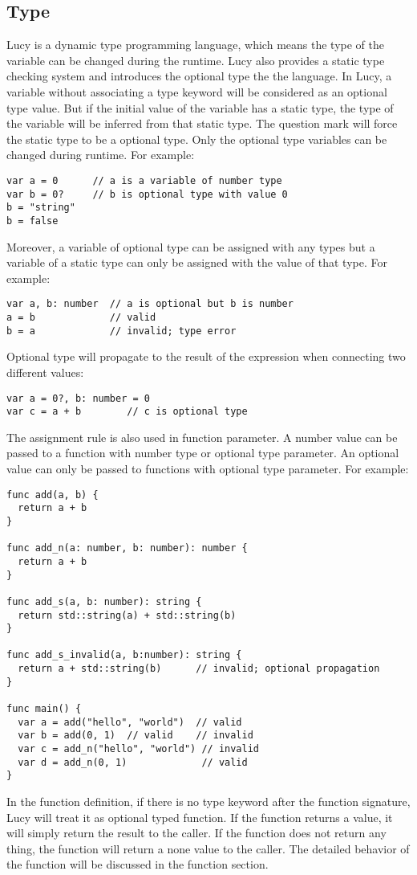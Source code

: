 \subsection{Type}
Lucy is a dynamic type programming language, which means the type of the variable can be changed during the runtime. Lucy also provides a static type checking system and introduces the optional type the the language. In Lucy, a variable without associating a type keyword will be considered as an optional type value. But if the initial value of the variable has a static type, the type of the variable will be inferred from that static type. The question mark will force the static type to be a optional type. Only the optional type variables can be changed during runtime. For example:
\begin{lstlisting}
var a = 0      // a is a variable of number type
var b = 0?     // b is optional type with value 0
b = "string"
b = false
\end{lstlisting}
Moreover, a variable of optional type can be assigned with any types but a variable of a static type can only be assigned with the value of that type. For example:
\begin{lstlisting}
var a, b: number  // a is optional but b is number
a = b             // valid
b = a             // invalid; type error
\end{lstlisting}
Optional type will propagate to the result of the expression when connecting two different values:
\begin{lstlisting}
var a = 0?, b: number = 0
var c = a + b        // c is optional type
\end{lstlisting}
The assignment rule is also used in function parameter. A number value can be passed to a function with number type or optional type parameter. An optional value can only be passed to functions with optional type parameter. For example:
\begin{lstlisting}
func add(a, b) {
  return a + b
}

func add_n(a: number, b: number): number {
  return a + b
}

func add_s(a, b: number): string {
  return std::string(a) + std::string(b)
}

func add_s_invalid(a, b:number): string {
  return a + std::string(b)      // invalid; optional propagation
}

func main() {
  var a = add("hello", "world")  // valid
  var b = add(0, 1)  // valid    // invalid
  var c = add_n("hello", "world") // invalid
  var d = add_n(0, 1)             // valid
}
\end{lstlisting}
In the function definition, if there is no type keyword after the function signature, Lucy will treat it as optional typed function. If the function returns a value, it will simply return the result to the caller. If the function does not return any thing, the function will return a none value to the caller. The detailed behavior of the function will be discussed in the function section.

